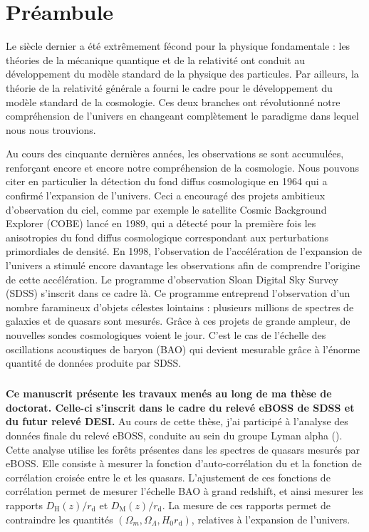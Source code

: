\documentclass[11pt, twoside, a4paper, openright]{report}
\begin{document}
\chapter*{Préambule}
\thispagestyle{plain}
Le  siècle dernier a été extrêmement fécond pour la physique fondamentale : les théories de la mécanique quantique et de la relativité ont conduit au développement du modèle standard de la physique des particules. Par ailleurs, la théorie de la relativité générale a fourni le cadre pour le développement du modèle standard de la cosmologie. Ces deux branches ont révolutionné notre compréhension de l'univers en changeant complètement le paradigme dans lequel nous nous trouvions.

Au cours des cinquante dernières années, les observations se sont accumulées, renforçant encore et encore notre compréhension de la cosmologie. Nous pouvons citer en particulier la détection du fond diffus cosmologique en 1964 qui a confirmé l'expansion de l'univers. Ceci a encouragé des projets ambitieux d'observation du ciel, comme par exemple le satellite Cosmic Background Explorer (COBE) lancé en 1989, qui a détecté pour la première fois les anisotropies du fond diffus cosmologique correspondant aux perturbations primordiales de densité.
En 1998, l'observation de l'accélération de l'expansion de l'univers a stimulé encore davantage les observations afin de comprendre l'origine de cette accélération. Le programme d'observation Sloan Digital Sky Survey (SDSS) s'inscrit dans ce cadre là. Ce programme entreprend l'observation d'un nombre faramineux d'objets célestes lointains : plusieurs millions de spectres de galaxies et de quasars sont mesurés.
Grâce à ces projets de grande ampleur, de nouvelles sondes cosmologiques voient le jour. C'est le cas de l'échelle des oscillations acoustiques de baryon (BAO) qui devient mesurable grâce à l'énorme quantité de données produite par SDSS.

\paragraph{}
\textbf{Ce manuscrit présente les travaux menés au long de ma thèse de doctorat.
Celle-ci s'inscrit dans le cadre du relevé eBOSS de SDSS et du futur relevé DESI.}
Au cours de cette thèse, j'ai participé à l'analyse des données finale du relevé eBOSS, conduite au sein du groupe Lyman alpha (\lya{}).
Cette analyse utilise les forêts \lya{} présentes dans les spectres de quasars mesurés par eBOSS.
Elle consiste à mesurer la fonction d'auto-corrélation du \lya{} et la fonction de corrélation croisée entre le \lya{} et les quasars.
L'ajustement de ces fonctions de corrélation permet de mesurer l'échelle BAO à grand redshift, et ainsi mesurer les rapports $D_{\mathrm{H}}(z) / r_{\mathrm{d}}$ et $D_{\mathrm{M}}(z) / r_{\mathrm{d}}$. La mesure de ces rapports permet de contraindre les quantités $(\Omega_{m} , \Omega_{\Lambda} , H_0 r_{\mathrm{d}})$, relatives à l'expansion de l'univers.
\end{document}

